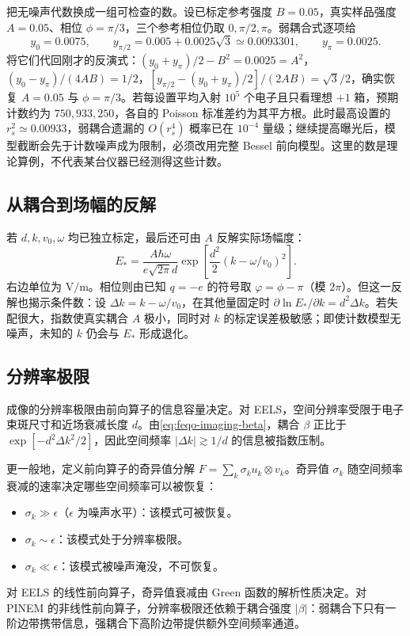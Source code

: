 把无噪声代数换成一组可检查的数。设已标定参考强度 \(B=0.05\)，真实样品强度 \(A=0.05\)、相位 \(\phi=\pi/3\)，三个参考相位仍取 \(0,\pi/2,\pi\)。弱耦合式逐项给
\[
y_0=0.0075,
\qquad y_{\pi/2}=0.005+0.0025\sqrt3\simeq0.0093301,
\qquad y_\pi=0.0025.
\]
将它们代回刚才的反演式：\((y_0+y_\pi)/2-B^2=0.0025=A^2\)，\((y_0-y_\pi)/(4AB)=1/2\)，\([y_{\pi/2}-(y_0+y_\pi)/2]/(2AB)=\sqrt3/2\)，确实恢复 \(A=0.05\) 与 \(\phi=\pi/3\)。若每设置平均入射 \(10^5\) 个电子且只看理想 \(+1\) 箱，预期计数约为 \(750,933,250\)，各自的 Poisson 标准差约为其平方根。此时最高设置的 \(r_s^2\simeq0.00933\)，弱耦合遗漏的 \(O(r_s^4)\) 概率已在 \(10^{-4}\) 量级；继续提高曝光后，模型截断会先于计数噪声成为限制，必须改用完整 Bessel 前向模型。这里的数是理论算例，不代表某台仪器已经测得这些计数。

\subsection{从耦合到场幅的反解}

若 \(d,k,v_0,\omega\) 均已独立标定，最后还可由 \(A\) 反解实际场幅度：
\begin{equation}
E_*=\frac{A\hbar\omega}{e\sqrt{2\pi}d}
\exp\!\left[\frac{d^2}{2}(k-\omega/v_0)^2\right].
\label{eq:feqo-imaging-field-inversion}
\end{equation}
右边单位为 \(\si{\volt\per\metre}\)。相位则由已知 \(q=-e\) 的符号取 \(\varphi=\phi-\pi\)（模 \(2\pi\)）。但这一反解也揭示条件数：设 \(\Delta k=k-\omega/v_0\)，在其他量固定时 \(\partial\ln E_*/\partial k=d^2\Delta k\)。若失配很大，指数使真实耦合 \(A\) 极小，同时对 \(k\) 的标定误差极敏感；即使计数模型无噪声，未知的 \(k\) 仍会与 \(E_*\) 形成退化。

\subsection{分辨率极限}

成像的分辨率极限由前向算子的信息容量决定。对 EELS，空间分辨率受限于电子束斑尺寸和近场衰减长度 \(d\)。由\cref{eq:feqo-imaging-beta}，耦合 \(\beta\) 正比于 \(\exp[-d^2\Delta k^2/2]\)，因此空间频率 \(|\Delta k|\gtrsim1/d\) 的信息被指数压制。

更一般地，定义前向算子的奇异值分解 \(F=\sum_k\sigma_k u_k\otimes v_k\)。奇异值 \(\sigma_k\) 随空间频率衰减的速率决定哪些空间频率可以被恢复：
\begin{itemize}
\item \(\sigma_k\gg\epsilon\)（\(\epsilon\) 为噪声水平）：该模式可被恢复。
\item \(\sigma_k\sim\epsilon\)：该模式处于分辨率极限。
\item \(\sigma_k\ll\epsilon\)：该模式被噪声淹没，不可恢复。
\end{itemize}
对 EELS 的线性前向算子，奇异值衰减由 Green 函数的解析性质决定。对 PINEM 的非线性前向算子，分辨率极限还依赖于耦合强度 \(|\beta|\)：弱耦合下只有一阶边带携带信息，强耦合下高阶边带提供额外空间频率通道。

